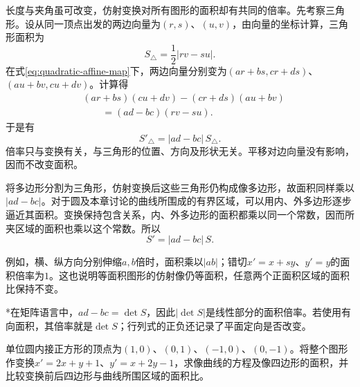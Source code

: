 长度与夹角虽可改变，仿射变换对所有图形的面积却有共同的倍率。先考察三角形。设从同一顶点出发的两边向量为\((r,s)\)、\((u,v)\)，由向量的坐标计算，三角形面积为
\begin{equation*}
    S_{\triangle}=\frac12|rv-su| .
\end{equation*}
在式\eqref{eq:quadratic-affine-map}下，两边向量分别变为\((ar+bs,cr+ds)\)、\((au+bv,cu+dv)\)。计算得
\begin{align*}
    &(ar+bs)(cu+dv)-(cr+ds)(au+bv)\\
    &\qquad=(ad-bc)(rv-su) .
\end{align*}
于是有
\begin{equation}\label{eq:quadratic-affine-area}
    S'_{\triangle}=|ad-bc|\,S_{\triangle} .
\end{equation}
倍率只与变换有关，与三角形的位置、方向及形状无关。平移对边向量没有影响，因而不改变面积。

将多边形分割为三角形，仿射变换后这些三角形仍构成像多边形，故面积同样乘以\(|ad-bc|\)。对于圆及本章讨论的曲线所围成的有界区域，可以用内、外多边形逐步逼近其面积。变换保持包含关系，内、外多边形的面积都乘以同一个常数，因而所夹区域的面积也乘以这个常数。所以
\begin{equation}\label{eq:quadratic-affine-region-area}
    S'=|ad-bc|\,S .
\end{equation}

例如，横、纵方向分别伸缩\(a,b\)倍时，面积乘以\(|ab|\)；错切\(x'=x+sy\)、\(y'=y\)的面积倍率为\(1\)。这也说明等面积图形的仿射像仍等面积，任意两个正面积区域的面积比保持不变。

{\kaiti{}*\quad 在矩阵语言中，\(ad-bc=\det S\)，因此\(|\det S|\)是线性部分的面积倍率。若使用有向面积，其倍率就是\(\det S\)；行列式的正负还记录了平面定向是否改变。}

\begin{example}\label{ex:quadratic-inscribed-square-area}
单位圆内接正方形的顶点为\((1,0)\)、\((0,1)\)、\((-1,0)\)、\((0,-1)\)。将整个图形作变换\(x'=2x+y+1\)、\(y'=x+2y-1\)，求像曲线的方程及像四边形的面积，并比较变换前后四边形与曲线所围区域的面积比。
\end{example}

